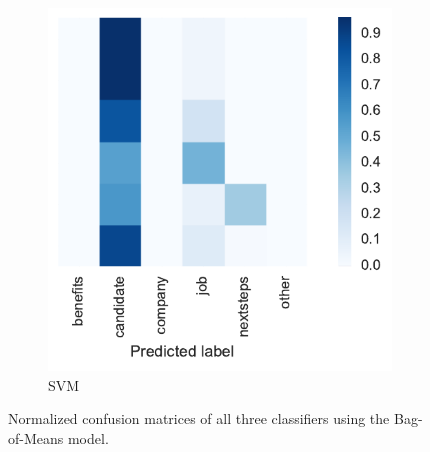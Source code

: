 \begin{figure}[h]
\begin{subfigure}[b]{0.32\textwidth}
        \includegraphics[width=\textwidth]{img/exp-vector-space/bom-conf-matrix-svm-normalized.pdf}
        \caption{SVM}
\label{fig:bom-conf-matrix-svm-normalized}
    \end{subfigure}
    \caption{Normalized confusion matrices of all three classifiers using the Bag-of-Means model.}
\label{fig:bom-conf-matrix}
\end{figure}

